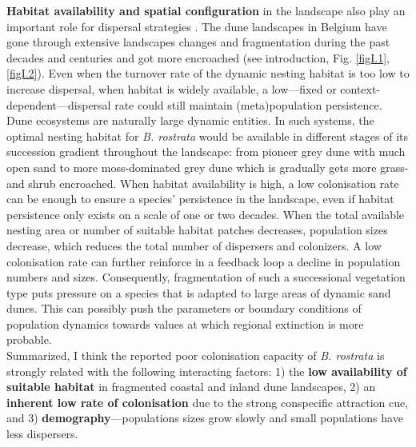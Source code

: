\documentclass[10pt, twoside]{book} %
\begin{document}
	\textbf{Habitat availability and spatial configuration} in the landscape also play an important role for dispersal strategies \citep{travis1999}. The dune landscapes in Belgium have gone through extensive landscapes changes and fragmentation during the past decades and centuries and got more encroached (see introduction, Fig. \ref{figI.1}, \ref{figI.2}). Even when the turnover rate of the dynamic nesting habitat is too low to increase dispersal, when habitat is widely available, a low---fixed or context-dependent---dispersal rate could still maintain (meta)population persistence. Dune ecosystems are naturally large dynamic entities. In such systems, the optimal nesting habitat for \textit{B. rostrata} would be available in different stages of its succession gradient throughout the landscape: from pioneer grey dune with much open sand to more moss-dominated grey dune which is gradually gets more grass- and shrub encroached. When habitat availability is high, a low colonisation rate can be enough to ensure a species' persistence in the landscape, even if habitat persistence only exists on a scale of one or two decades. When the total available nesting area or number of suitable habitat patches decreases, population sizes decrease, which reduces the total number of dispersers and colonizers. A low colonisation rate can further reinforce in a feedback loop a decline in population numbers and sizes. Consequently, fragmentation of such a successional vegetation type puts pressure on a species that is adapted to large areas of dynamic sand dunes. This can possibly push the parameters or boundary conditions of population dynamics towards values at which regional extinction is more probable.\\
	
	Summarized, I think the reported poor colonisation capacity of \textit{B. rostrata} \citep{nielsen1945, blosch2000, bogusch2021} is strongly related with the following interacting factors: 1) the \textbf{low availability of suitable habitat} in fragmented coastal and inland dune landscapes, 2) an \textbf{inherent low rate of colonisation} due to the strong conspecific attraction cue, and 3) \textbf{demography}---populations sizes grow slowly and small populations have less dispersers.\\
	
\end{document}
